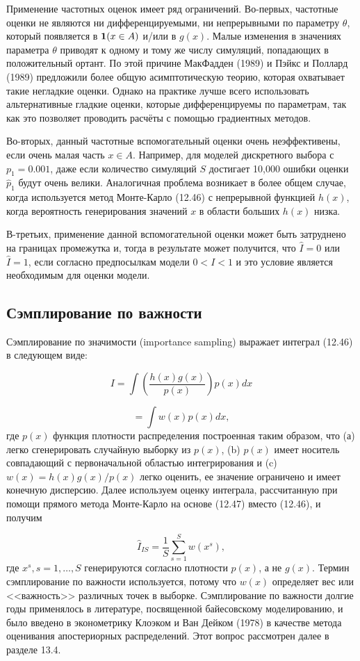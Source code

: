 Применение частотных оценок имеет ряд ограничений. Во-первых, частотные оценки не являются ни дифференцируемыми, ни непрерывными по параметру $\theta$, который появляется в ${\bf{1}}(x \in A)$ и/или в $g(x)$. Малые изменения в значениях параметра $\theta$ приводят к одному и тому же числу симуляций, попадающих в положительный ортант. По этой причине МакФадден (1989) и Пэйкс и Поллард (1989) предложили более общую асимптотическую теорию, которая охватывает такие негладкие оценки. Однако на практике лучше всего  использовать альтернативные гладкие оценки, которые дифференцируемы по параметрам, так как это позволяет проводить расчёты с помощью градиентных методов.

Во-вторых, данный частотные вспомогательный оценки очень неэффективены, если очень малая часть $x \in A$. Например, для моделей дискретного выбора с $p_1=0.001$, даже если количество симуляций $S$ достигает 10,000 ошибки оценки $\hat{p}_1$ будут очень велики. Аналогичная проблема возникает в более общем случае, когда используется метод Монте-Карло (12.46) с непрерывной функцией $h(x)$, когда вероятность генерирования значений $x$ в области больших $h(x)$ низка.

В-третьих, применение данной вспомогательной оценки может быть затруднено на границах промежутка и, тогда в результате может получится, что $\hat{I}=0$ или $\hat{I}=1$, если согласно предпосылкам модели $0<I<1$ и это условие является необходимым для оценки модели.

\subsection{Сэмплирование по важности}

Сэмплирование по значимости (importance sampling) выражает интеграл (12.46) в следующем виде:

\begin{equation}
I=\int{\left(\dfrac{h(x)g(x)}{p(x)}\right)p(x)dx}
\end{equation}

\[
=\int{w(x)p(x)dx},
\]
где $p(x)$ функция плотности распределения построенная таким образом, что (а) легко сгенерировать случайную выборку из $p(x)$, (b) $p(x)$ имеет носитель совпадающий с  первоначальной областью интегрирования и (c) $w(x)=h(x)g(x)/p(x)$ легко оценить, ее значение ограничено и имеет конечную дисперсию. Далее используем оценку интеграла, рассчитанную при помощи прямого метода Монте-Карло на основе (12.47) вместо (12.46), и получим

\begin{equation}
\hat{I}_{IS}=\dfrac{1}{S}\sum^{S}_{s=1}w(x^{s}),
\end{equation}
где $x^s, s=1,\ldots ,S$ генерируются согласно плотности $p(x)$, а не $g(x)$. Термин сэмплирование по важности используется, потому что $w(x)$ определяет вес или <<важность>> различных точек в выборке. Сэмплирование по важности долгие годы применялось в литературе, посвященной байесовскому моделированию, и было введено в эконометрику Клоэком и Ван Дейком (1978) в качестве метода оценивания апостериорных распределений. Этот вопрос рассмотрен далее в разделе 13.4.

